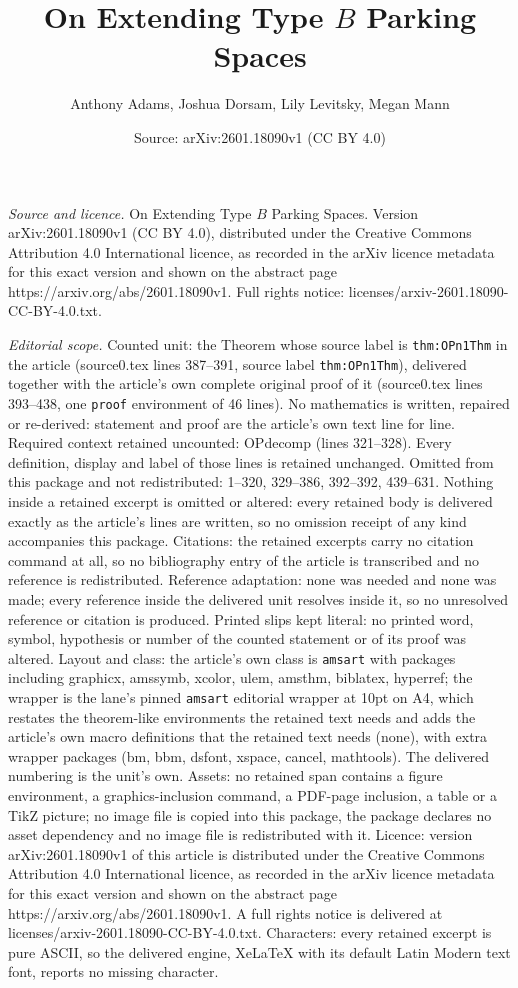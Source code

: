 \documentclass[10pt,a4paper]{amsart}
\title[On Extending Type $B$ Parking Spaces]{On Extending Type $B$ Parking Spaces}
\author{Anthony Adams, Joshua Dorsam, Lily Levitsky, Megan Mann}
\date{Source: arXiv:2601.18090v1 (CC BY 4.0)}
\begin{document}
\maketitle

\noindent\emph{Source and licence.} On Extending Type $B$ Parking Spaces. Version arXiv:2601.18090v1 (CC BY 4.0), distributed under the Creative Commons Attribution 4.0 International licence, as recorded in the arXiv licence metadata for this exact version and shown on the abstract page https://arxiv.org/abs/2601.18090v1. Full rights notice: licenses/arxiv-2601.18090-CC-BY-4.0.txt.\par\smallskip

\noindent\textit{Editorial scope.} Counted unit: the Theorem whose source label is \texttt{thm:OPn1Thm} in the article (source0.tex lines 387--391, source label \texttt{thm:OPn1Thm}), delivered together with the article's own complete original proof of it (source0.tex lines 393--438, one \texttt{proof} environment of 46 lines). No mathematics is written, repaired or re-derived: statement and proof are the article's own text line for line. Required context retained uncounted: OPdecomp (lines 321--328). Every definition, display and label of those lines is retained unchanged. Omitted from this package and not redistributed: 1--320, 329--386, 392--392, 439--631. Nothing inside a retained excerpt is omitted or altered: every retained body is delivered exactly as the article's lines are written, so no omission receipt of any kind accompanies this package. Citations: the retained excerpts carry no citation command at all, so no bibliography entry of the article is transcribed and no reference is redistributed. Reference adaptation: none was needed and none was made; every reference inside the delivered unit resolves inside it, so no unresolved reference or citation is produced. Printed slips kept literal: no printed word, symbol, hypothesis or number of the counted statement or of its proof was altered. Layout and class: the article's own class is \texttt{amsart} with packages including graphicx, amssymb, xcolor, ulem, amsthm, biblatex, hyperref; the wrapper is the lane's pinned \texttt{amsart} editorial wrapper at 10pt on A4, which restates the theorem-like environments the retained text needs and adds the article's own macro definitions that the retained text needs (none), with extra wrapper packages (bm, bbm, dsfont, xspace, cancel, mathtools). The delivered numbering is the unit's own. Assets: no retained span contains a figure environment, a graphics-inclusion command, a PDF-page inclusion, a table or a TikZ picture; no image file is copied into this package, the package declares no asset dependency and no image file is redistributed with it. Licence: version arXiv:2601.18090v1 of this article is distributed under the Creative Commons Attribution 4.0 International licence, as recorded in the arXiv licence metadata for this exact version and shown on the abstract page https://arxiv.org/abs/2601.18090v1. A full rights notice is delivered at licenses/arxiv-2601.18090-CC-BY-4.0.txt. Characters: every retained excerpt is pure ASCII, so the delivered engine, XeLaTeX with its default Latin Modern text font, reports no missing character.
\end{document}
